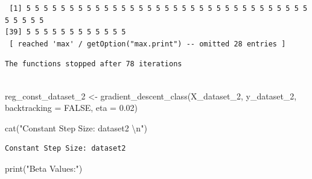 \documentclass[
  letterpaper,
  DIV=11,
  numbers=noendperiod]{scrartcl}
\newenvironment{Shaded}{\begin{snugshade}}{\end{snugshade}}
\newcommand{\AttributeTok}[1]{\textcolor[rgb]{0.40,0.45,0.13}{#1}}
\newcommand{\ConstantTok}[1]{\textcolor[rgb]{0.56,0.35,0.01}{#1}}
\newcommand{\FloatTok}[1]{\textcolor[rgb]{0.68,0.00,0.00}{#1}}
\newcommand{\FunctionTok}[1]{\textcolor[rgb]{0.28,0.35,0.67}{#1}}
\newcommand{\NormalTok}[1]{\textcolor[rgb]{0.00,0.23,0.31}{#1}}
\newcommand{\OtherTok}[1]{\textcolor[rgb]{0.00,0.23,0.31}{#1}}
\newcommand{\SpecialCharTok}[1]{\textcolor[rgb]{0.37,0.37,0.37}{#1}}
\newcommand{\StringTok}[1]{\textcolor[rgb]{0.13,0.47,0.30}{#1}}
\begin{document}
\begin{Shaded}
\end{Shaded}

\begin{verbatim}
 [1] 5 5 5 5 5 5 5 5 5 5 5 5 5 5 5 5 5 5 5 5 5 5 5 5 5 5 5 5 5 5 5 5 5 5 5 5 5 5
[39] 5 5 5 5 5 5 5 5 5 5 5 5
 [ reached 'max' / getOption("max.print") -- omitted 28 entries ]
\end{verbatim}

\begin{Shaded}
\end{Shaded}

\begin{verbatim}
The functions stopped after 78 iterations 
 
\end{verbatim}

\begin{Shaded}
\begin{Highlighting}[]
\NormalTok{reg\_const\_dataset\_2 }\OtherTok{\textless{}{-}} \FunctionTok{gradient\_descent\_class}\NormalTok{(X\_dataset\_2, y\_dataset\_2, }\AttributeTok{backtracking =} \ConstantTok{FALSE}\NormalTok{, }\AttributeTok{eta =} \FloatTok{0.02}\NormalTok{)}

\FunctionTok{cat}\NormalTok{(}\StringTok{"Constant Step Size: dataset2 }\SpecialCharTok{\textbackslash{}n}\StringTok{"}\NormalTok{)}
\end{Highlighting}
\end{Shaded}

\begin{verbatim}
Constant Step Size: dataset2 
\end{verbatim}

\begin{Shaded}
\begin{Highlighting}[]
\FunctionTok{print}\NormalTok{(}\StringTok{"Beta Values:"}\NormalTok{)}
\end{Highlighting}
\end{Shaded}
\end{document}
